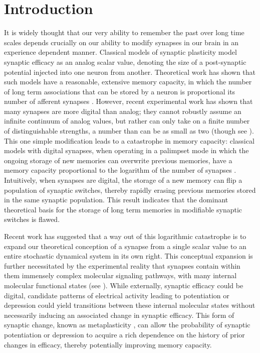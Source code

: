 \documentclass{article} %
\begin{document}
\section{Introduction}\label{sec:intro}

It is widely thought that our very ability to remember the past over long time scales depends crucially on our ability to modify synapses in our brain in an experience dependent manner.
Classical models of synaptic plasticity model synaptic efficacy as an analog scalar value, denoting the size of a post-synaptic potential injected into one neuron from another.
Theoretical work has shown that such models have a reasonable, extensive memory capacity, in which the number of long term associations that can be stored by a neuron is proportional its number of afferent synapses \cite{Hopfield1982model,Amit1985hopfield,Gardner1988perceptron}.
However, recent experimental work has shown that many synapses are more digital than analog; they cannot robustly assume an infinite continuum of analog values, but rather can only take on a finite number of distinguishable strengths, a number than can be as small as two \cite{Bliss1993LTP,Petersen1998allornone,O'Connor2005switch} (though see \cite{Enoki2009graded}).
This one simple modification leads to a catastrophe in memory capacity:  classical models with digital synapses, when operating in a palimpset mode in which the ongoing storage of new memories can overwrite previous memories, have a memory capacity proportional to the logarithm of the number of synapses \cite{amit1992constraints,amit1994learning}.
Intuitively, when synapses are digital, the storage of a new memory can flip a population of synaptic switches, thereby rapidly erasing previous memories stored in the same synaptic population. This result indicates that the dominant theoretical basis for the storage of long term memories in modifiable synaptic switches is flawed.

Recent work \cite{Fusi2005cascade,Fusi2007multistate,Leibold2008serial} has suggested that a way out of this logarithmic catastrophe is to expand our theoretical conception of a synapse from a single scalar value to an entire stochastic dynamical system in its own right.
This conceptual expansion is further necessitated by the experimental reality that synapses contain within them immensely complex molecular signaling pathways, with many internal molecular functional states (\eg see \cite{Bliss1993LTP,Bredt2003AMPA,Coba2009phosphorylation}).
While externally, synaptic efficacy could be digital, candidate patterns of electrical activity leading to potentiation or depression could yield transitions between these internal molecular states without necessarily inducing an associated change in synaptic efficacy.
This form of synaptic change, known as metaplasticity \cite{Abraham1996metaplasticity,Montgomery2002765}, can allow the probability of synaptic potentiation or depression to acquire a rich dependence on the history of prior changes in efficacy, thereby potentially improving memory capacity.
\end{document}
